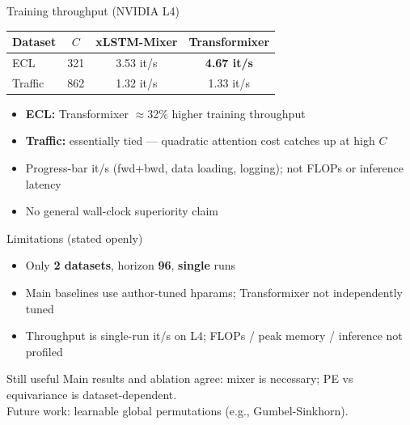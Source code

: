 \documentclass[aspectratio=169,11pt]{beamer}
\begin{document}
\begin{frame}{Training throughput (NVIDIA L4)}
  \centering
  {\small
  \begin{tabular}{lccc}
    \toprule
    Dataset & $C$ & xLSTM-Mixer & Transformixer \\
    \midrule
    ECL     & 321 & 3.53 it/s & \textbf{4.67 it/s} \\
    Traffic & 862 & 1.32 it/s & 1.33 it/s \\
    \bottomrule
  \end{tabular}}

  \vspace{0.8em}
  \begin{itemize}
    \item \textbf{ECL:} Transformixer $\approx$32\% higher training throughput
    \item \textbf{Traffic:} essentially tied --- quadratic attention cost catches up at high $C$
    \item Progress-bar it/s (fwd+bwd, data loading, logging); \alert{not} FLOPs or inference latency
    \item No general wall-clock superiority claim
  \end{itemize}
\end{frame}

\begin{frame}{Limitations (stated openly)}
  \begin{itemize}
    \item Only \textbf{2 datasets}, horizon \textbf{96}, \textbf{single} runs
    \item Main baselines use author-tuned hparams; Transformixer not independently tuned
    \item Throughput is single-run it/s on L4; FLOPs / peak memory / inference not profiled
  \end{itemize}

  \vspace{0.6em}
  \begin{block}{Still useful}
    Main results and ablation agree: mixer is necessary; PE vs equivariance is dataset-dependent.\\
    Future work: learnable global permutations (e.g., Gumbel-Sinkhorn).
  \end{block}
\end{frame}
\end{document}
